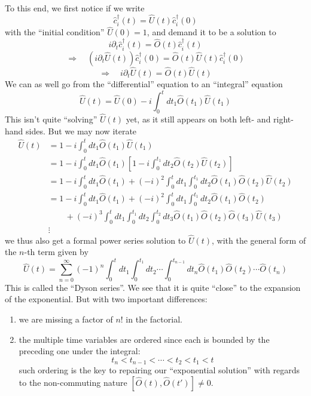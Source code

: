 To this end, we first notice if we write
\[ \hat{c}_{i}^{\dagger}\left( t \right) =\hat{U}\left( t \right) \hat{c}_{i}^{\dagger}\left( 0 \right) \]
with the ``initial condition'' $\hat{U}\left( 0 \right) =1$, and demand it to be a solution to
\[ i\partial _t\hat{c}_{i}^{\dagger}\left( t \right) =\hat{O}\left( t \right) \hat{c}_{i}^{\dagger}\left( t \right) \]
\[ \Rightarrow \quad \left( i\partial _t\hat{U}\left( t \right) \right) \hat{c}_{i}^{\dagger}\left( 0 \right) =\hat{O}\left( t \right) \hat{U}\left( t \right) \hat{c}_{i}^{\dagger}\left( 0 \right) \]
\[ \Rightarrow \quad i\partial _t\hat{U}\left( t \right) =\hat{O}\left( t \right) \hat{U}\left( t \right) \]
We can as well go from the ``differential'' equation to an ``integral'' equation
\[ \hat{U}\left( t \right) =\hat{U}\left( 0 \right) -i\int_0^t{dt_1\hat{O}\left( t_1 \right) \hat{U}\left( t_1 \right)}\]
This isn't quite ``solving'' $\hat{U}(t)$ yet, as it still appears on both left- and right-hand sides. But we may now iterate
\begin{align*}
    \hat{U}\left( t \right) &=1-i\int_0^t{dt_1\hat{O}\left( t_1 \right) \hat{U}\left( t_1 \right)}\\
    &=1-i\int_0^t{dt_1\hat{O}\left( t_1 \right) \left[ 1-i\int_0^{t_1}{dt_2\hat{O}\left( t_2 \right) \hat{U}\left( t_2 \right)} \right]}\\
    &=1-i\int_0^t{dt_1\hat{O}\left( t_1 \right)}+\left( -i \right) ^2\int_0^t{dt_1\int_0^{t_1}{dt_2\hat{O}\left( t_1 \right) \hat{O}\left( t_2 \right) \hat{U}\left( t_2 \right)}}\\
    &=1-i\int_0^t{dt_1\hat{O}\left( t_1 \right)}+\left( -i \right) ^2\int_0^t{dt_1\int_0^{t_1}{dt_2\hat{O}\left( t_1 \right) \hat{O}\left( t_2 \right)}}\\
    &\qquad+\left( -i \right) ^3\int_0^t{dt_1\int_0^{t_1}{dt_2\int_0^{t_2}{dt_3\hat{O}\left( t_1 \right) \hat{O}\left( t_2 \right) \hat{O}\left( t_3 \right) \hat{U}\left( t_3 \right)}}}\\
    &\vdots
\end{align*}
we thus also get a formal power series solution to $\hat{U}(t)$, with the general form of the $n$-th term given by
\[ \hat{U}\left( t \right) =\sum_{n=0}^{\infty}{\left( -1 \right) ^n\int_0^t{dt_1\int_0^{t_1}{dt_2}\cdots \int_0^{t_{n-1}}{dt_n\hat{O}\left( t_1 \right) \hat{O}\left( t_2 \right) \cdots \hat{O}\left( t_n \right)}}}\]
This is called the ``Dyson series''. We see that it is quite ``close'' to the expansion of the exponential. But with two important differences:
\begin{enumerate}
    \item we are missing a factor of $n!$ in the factorial.
    \item the multiple time variables are ordered since each is bounded by the preceding one under the integral:
    \[ t_n<t_{n-1}<\cdots <t_2<t_1<t\]
    such ordering is the key to repairing our ``exponential solution'' with regards to the non-commuting nature $\left[ \hat{O}\left( t \right) ,\hat{O}\left( t' \right) \right] \ne 0$.
\end{enumerate}

